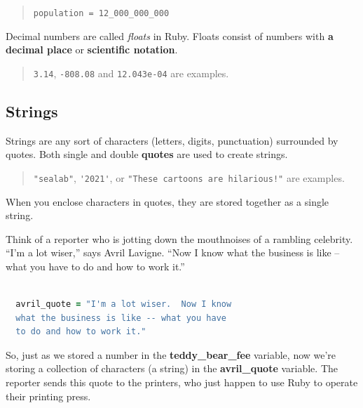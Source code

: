 \documentclass[10pt,twoside]{report}
\begin{document}
\begin{quote}
\lstinline[breaklines=true]|population = 12_000_000_000|\end{quote}


Decimal numbers are called {\em floats} in Ruby.  Floats consist of
numbers with {\bf a decimal place} or {\bf scientific notation}.

\begin{quote}
\lstinline[breaklines=true]|3.14|,
\lstinline[breaklines=true]|-808.08| and
\lstinline[breaklines=true]|12.043e-04| are examples.\end{quote}





\subsection{Strings}



Strings are any sort of characters (letters, digits, punctuation)
surrounded by quotes.  Both single and double {\bf quotes} are used to
create strings.

\begin{quote}
\lstinline[breaklines=true]|"sealab"|,
\lstinline[breaklines=true]|'2021'|, or
\lstinline[breaklines=true]|"These cartoons are hilarious!"| are
examples.\end{quote}


When you enclose characters in quotes, they are stored together as a
single string.

Think of a reporter who is jotting down the mouthnoises of a rambling
celebrity.  ``I'm a lot wiser,'' says Avril Lavigne.  ``Now I know
what the business is like -- what you have to do and how to work it.''


\begin{lstlisting}[basicstyle=\ttfamily\color{basiccolor},
    commentstyle = \ttfamily\color{commentcolor},
    keywordstyle=\ttfamily\color{keywordscolor},
    stringstyle=\color{stringcolor},
    language=Ruby,
    basicstyle=\small\ttfamily,
    showstringspaces=false,
  ]

  avril_quote = "I'm a lot wiser.  Now I know
  what the business is like -- what you have
  to do and how to work it."

\end{lstlisting}


So, just as we stored a number in the {\bf teddy\_bear\_fee} variable,
now we're storing a collection of characters (a string) in the {\bf
  avril\_quote} variable.  The reporter sends this quote to the
printers, who just happen to use Ruby to operate their printing press.
\end{document}
